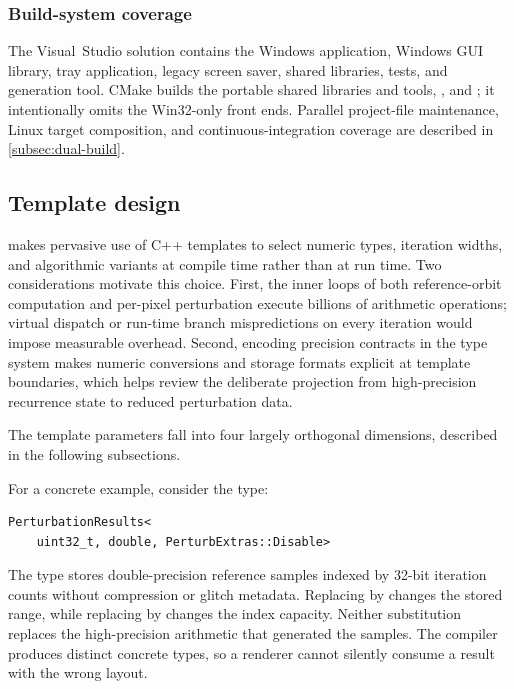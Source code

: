 \subsubsection{Build-system coverage}

The Visual~Studio solution contains the Windows application, Windows GUI
library, tray application, legacy screen saver, shared libraries, tests, and
generation tool.  CMake builds the portable shared libraries and tools,
, and ; it intentionally omits
the Win32-only front ends.  Parallel project-file maintenance, Linux target
composition, and continuous-integration coverage are described in
\cref{subsec:dual-build}.
\subsection{Template design}%
\label{sec:template-design}

\FractalShark{} makes pervasive use of C++ templates to select numeric
types, iteration widths, and algorithmic variants at compile time rather
than at run time.  Two considerations motivate this choice.  First,
the inner loops of both reference-orbit computation and per-pixel
perturbation execute billions of arithmetic operations; virtual dispatch
or run-time branch mispredictions on every iteration would impose
measurable overhead.  Second, encoding precision contracts in the type
system makes numeric conversions and storage formats explicit at template
boundaries, which helps review the deliberate projection from high-precision
recurrence state to reduced perturbation data.

The template parameters fall into four largely orthogonal dimensions,
described in the following subsections.

For a concrete example, consider the type:
\begin{lstlisting}
PerturbationResults<
    uint32_t, double, PerturbExtras::Disable>
\end{lstlisting}
The type stores double-precision reference samples indexed by 32-bit iteration
counts without compression or glitch metadata. Replacing
 by  changes the stored range, while
replacing  by  changes the index capacity.
Neither substitution replaces the high-precision arithmetic that generated
the samples. The compiler produces distinct concrete types, so a renderer
cannot silently consume a result with the wrong layout.


